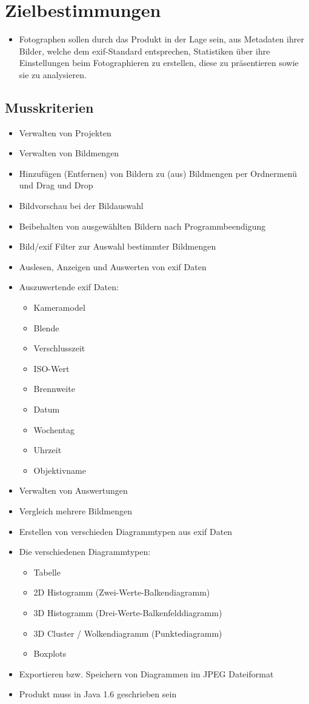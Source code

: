 \section{Zielbestimmungen}
\begin{itemize}
  \item Fotographen sollen durch das Produkt in der Lage sein, aus Metadaten ihrer Bilder, welche dem \gls{exif}-Standard entsprechen, Statistiken über ihre Einstellungen beim Fotographieren zu erstellen, diese zu präsentieren sowie sie zu analysieren.
  \end{itemize} 
\subsection{Musskriterien} 
\begin{itemize}
	\item Verwalten von Projekten
	\item Verwalten von Bildmengen
	\item Hinzufügen (Entfernen) von Bildern zu (aus) Bildmengen per Ordnermenü und Drag und Drop
	\item Bildvorschau bei der Bildauswahl
	\item Beibehalten von ausgewählten Bildern nach Programmbeendigung
	\item Bild/\gls{exif} Filter zur Auswahl bestimmter Bildmengen
	\item Auslesen, Anzeigen und Auswerten von \gls{exif} Daten
	\item Auszuwertende \gls{exif} Daten:
			\begin{itemize}
			\item Kameramodel
			\item Blende 
			\item Verschlusszeit
			\item ISO-Wert
			\item Brennweite
			\item Datum
			\item Wochentag
			\item Uhrzeit
			\item Objektivname
		\end{itemize}
	\item Verwalten von Auswertungen
	\item Vergleich mehrere Bildmengen
	\item Erstellen von verschieden Diagrammtypen aus \gls{exif} Daten
	\item Die verschiedenen Diagrammtypen:
		\begin{itemize}
		  \item Tabelle
			\item 2D Histogramm (Zwei-Werte-Balkendiagramm)
			\item 3D Histogramm (Drei-Werte-Balkenfelddiagramm)
			\item 3D Cluster / Wolkendiagramm (Punktediagramm)
			\item Boxplots
		\end{itemize}
	\item Exportieren bzw. Speichern von Diagrammen im JPEG Dateiformat
	\item Produkt muss in Java 1.6 geschrieben sein	
\end{itemize}


